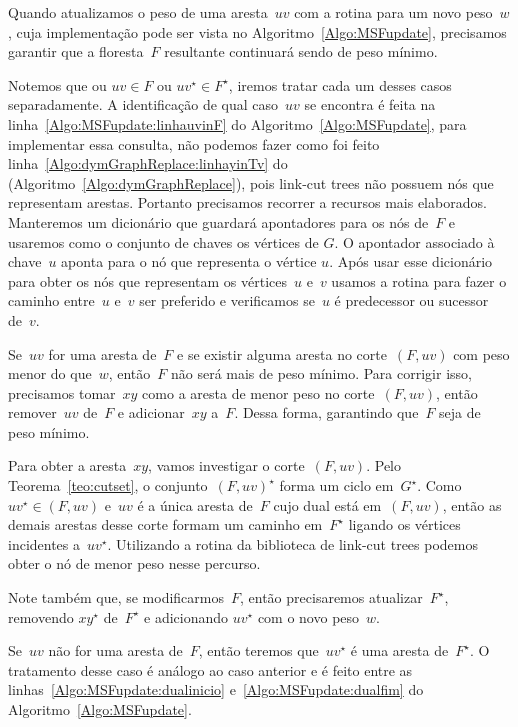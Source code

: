 Quando atualizamos o peso de uma aresta~$uv$ com a rotina \MSFupdate{} para um novo peso~$w$, cuja implementação pode ser vista no Algoritmo~\ref{Algo:MSFupdate}, precisamos garantir que a floresta~$F$ resultante continuará sendo  de peso mínimo.

Notemos que ou $uv\in F$ ou $uv^\star\in F^\star$, iremos tratar cada um desses casos separadamente.
A identificação de qual caso~$uv$ se encontra é feita na linha~\ref{Algo:MSFupdate:linhauvinF} do Algoritmo~\ref{Algo:MSFupdate}, para implementar essa consulta, não podemos fazer como foi feito linha~\ref{Algo:dymGraphReplace:linhayinTv} do \dymGraphReplace(Algoritmo~\ref{Algo:dymGraphReplace}), pois link-cut trees não possuem nós que representam arestas.
Portanto precisamos recorrer a recursos mais elaborados.
Manteremos um dicionário que guardará apontadores para os nós de~$F$ e usaremos como o conjunto de chaves os vértices de $G$. O apontador associado à chave~$u$ aponta para o nó que representa o vértice $u$.
Após usar esse dicionário para obter os nós que representam os vértices~$u$ e~$v$ usamos a rotina \linkcutPath{} para fazer o caminho entre~$u$ e~$v$ ser preferido e verificamos se~$u$ é predecessor ou sucessor de~$v$.

Se~$uv$ for uma aresta de~$F$ e se existir alguma aresta no corte~$(F, uv)$ com peso menor do que~$w$, então~$F$ não será mais de peso mínimo.
Para corrigir isso, precisamos tomar~$xy$ como a aresta de menor peso no corte~$(F, uv)$,
então remover~$uv$ de~$F$ e adicionar~$xy$ a~$F$.
Dessa forma, garantindo que~$F$ seja de peso mínimo.

Para obter a aresta~$xy$, vamos investigar o corte~$(F, uv)$.
Pelo Teorema~\ref{teo:cutset}, o conjunto~$(F, uv)^\star$ forma um ciclo em~$G^\star$.
Como~$uv^\star\in(F, uv)$ e~$uv$ é a única aresta de~$F$ cujo dual está em~$(F, uv)$, então as demais arestas desse corte formam um caminho em~$F^\star$ ligando os vértices incidentes a~$uv^\star$.
Utilizando a rotina \linkcutMin{}  da biblioteca de link-cut trees podemos obter o nó de menor peso nesse percurso.

Note também que, se modificarmos~$F$, então precisaremos atualizar~$F^\star$, removendo $xy^\star$ de~$F^\star$ e adicionando $uv^\star$ com o novo peso~$w$.

Se~$uv$ não for uma aresta de~$F$, então teremos que~$uv^\star$ é uma aresta de~$F^\star$.
O tratamento desse caso é análogo ao caso anterior e é feito entre as linhas~\ref{Algo:MSFupdate:dualinicio} e~\ref{Algo:MSFupdate:dualfim} do Algoritmo~\ref{Algo:MSFupdate}.

